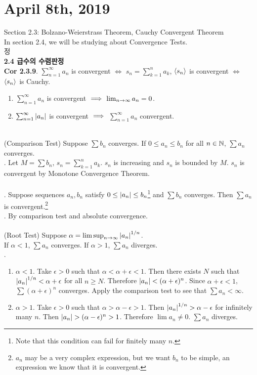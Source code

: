 \section*{April 8th, 2019}
Section 2.3: Bolzano-Weierstrass Theorem, Cauchy Convergent Theorem\\
In section 2.4, we will be studying about Convergence Tests.\\정
\\
\textbf{2.4 급수의 수렴판정}\\
\textbf{Cor 2.3.9}. $ \sum_{n=1}^{\infty} a_n $ is convergent $\iff$ $s_n = \sum_{k=1}^n a_k$, $\left\langle s_n \right\rangle$ is convergent $\iff$ $\left\langle s_n \right\rangle$ is Cauchy.
\begin{enumerate}
	\item $\sum_{n=1}^\infty a_n$ is convergent $\implies$ $\lim_{n\rightarrow \infty} a_n = 0$.
	\item $\sum_{n=1}^\infty \left|a_n\right|$ is convergent $\implies$ $\sum_{n=1}^\infty a_n$ convergent.
\end{enumerate}~\\
 (Comparison Test) Suppose $\sum b_n$ converges. If $0\leq a_n\leq b_n$ for all $n\in \mathbb{N}$, $\sum a_n$ converges.\\
\pf. Let $M = \sum b_n$, $s_n = \sum_{k=1}^n a_k$. $s_n$ is increasing and $s_n$ is bounded by $M$. $s_n$ is convergent by Monotone Convergence Theorem.\\
\\
\thm{}. Suppose sequences $a_n, b_n$ satisfy $0\leq \left|a_n\right|\leq b_n$\footnote{Note that this condition can fail for finitely many $n$.} and $\sum b_n$ converges. Then $\sum a_n$ is convergent.\footnote{$a_n$ may be a very complex expression, but we want $b_n$ to be simple, an expression we know that it is convergent.}\\
\pf. By comparison test and absolute convergence.\\
\\
 (Root Test) Suppose $\alpha = \limsup_{n\rightarrow\infty} \left|a_n\right|^{1/n}$.\\
If $\alpha < 1$, $\sum a_n$ converges. If $\alpha>1$, $\sum a_n$ diverges.\\
\pf.
\begin{enumerate}
	\item $\alpha < 1$. Take $\epsilon > 0$ such that $\alpha < \alpha+\epsilon<1$. Then there exists $N$ such that $\left|a_n\right|^{1/n} < \alpha+\epsilon$ for all $n\geq N$. Therefore
	$\left|a_n\right| < (\alpha+\epsilon)^n$. Since $\alpha+\epsilon < 1$, $\sum (\alpha + \epsilon)^n$ converges. Apply the comparison test to see that $\sum a_n <\infty$.
	\item $\alpha > 1$. Take $\epsilon >0$ such that $\alpha > \alpha - \epsilon > 1$. Then $\left|a_n\right|^{1/n} > \alpha-\epsilon$ for infinitely many $n$. Then $\left|a_n\right| > (\alpha -\epsilon)^n > 1$. Therefore $\lim a_n \neq 0$. $\sum a_n$ diverges.
\end{enumerate}
